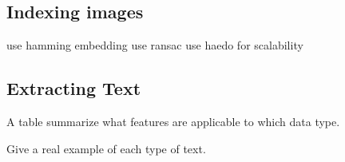 \documentclass{www2010-submission}
\begin{document}


\subsection{Indexing images}
        use hamming embedding
        use ransac
        use haedo for scalability

\subsection{Extracting Text}

A table summarize what features are applicable to which data type.

Give a real example of each type of text.
\end{document}
